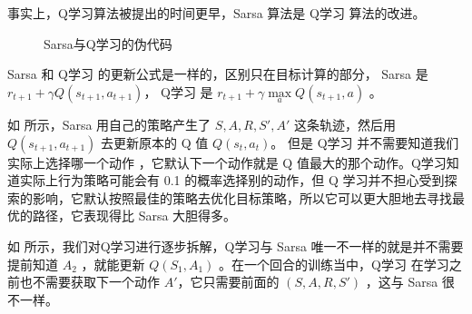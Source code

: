 \begin{tcolorbox}[colframe=blue!25,colback=blue!10]
事实上，Q学习算法被提出的时间更早，Sarsa 算法是 Q学习 算法的改进。
\end{tcolorbox}

\begin{figure}[htb]
	\centering
	\caption{Sarsa与Q学习的伪代码}
	\label{fig:fig3.18}
\end{figure}

Sarsa 和 Q学习 的更新公式是一样的，区别只在目标计算的部分，
	Sarsa 是 $r_{t+1}+\gamma Q(s_{t+1}, a_{t+1})$， 
	Q学习 是 $r_{t+1}+\gamma  \underset{a}{\max} Q\left(s_{t+1}, a\right)$ 。

如 所示，Sarsa 用自己的策略产生了 $S,A,R,S',A'$ 这条轨迹，然后用 $Q(s_{t+1},a_{t+1})$ 去更新原本的 Q 值 $Q(s_t,a_t)$。 
但是 Q学习 并不需要知道我们实际上选择哪一个动作 ，它默认下一个动作就是 Q 值最大的那个动作。Q学习知道实际上行为策略可能会有 0.1 的概率选择别的动作，但 Q 学习并不担心受到探索的影响，它默认按照最佳的策略去优化目标策略，所以它可以更大胆地去寻找最优的路径，它表现得比 Sarsa 大胆得多。

如 所示，我们对Q学习进行逐步拆解，Q学习与 Sarsa 唯一不一样的就是并不需要提前知道 $A_2$ ，就能更新 $Q(S_1,A_1)$ 。在一个回合的训练当中，Q学习 在学习之前也不需要获取下一个动作 $A'$，它只需要前面的 $ (S,A,R,S')$ ，这与 Sarsa 很不一样。 

